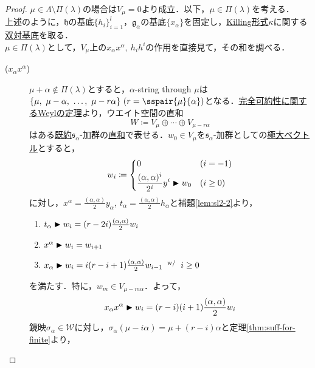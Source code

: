 \documentclass[rep_main]{subfiles}
\begin{document}
\begin{proof}
	$\mu \in \Lambda \setminus \Pi(\lambda)$の場合は$V_\mu = 0$より成立．以下，$\mu \in \Pi(\lambda)$を考える．\\
	上述のように，$\mathfrak{h}$の基底$\{h_i\}_{i=1}^l$，$\mathfrak{g}_\alpha$の基底$\{x_\alpha\}$を固定し，\hyperref[def:Killing-form]{Killing形式}$\kappa$に関する\hyperref[lem:Casimir]{双対基底}を取る．\\
	$\mu \in \Pi(\lambda)$として，$V_\mu$上の$x_\alpha x^\alpha,\ h_ih^i$の作用を直接見て，その和を調べる．
	\begin{description}
		\item[($x_\alpha x^\alpha$)] $\mu + \alpha \notin \Pi(\lambda)$とすると，$\alpha$-string through $\mu$は$\{\mu,\ \mu - \alpha,\ \ldots,\ \mu - r\alpha\}\ (r = \sspair{\mu}{\alpha})$となる．\hyperref[thm:Weyl]{完全可約性に関するWeylの定理}より，ウエイト空間の直和
		\begin{equation}
			W \coloneqq V_\mu \oplus \cdots \oplus V_{\mu - r\alpha}
		\end{equation}
		はある\hyperref[def:irr]{既約}$\mathfrak{s}_\alpha$-加群の\hyperref[def:gmod-directsum]{直和}で表せる．$w_0 \in V_\mu$を$\mathfrak{s}_\alpha$-加群としての\hyperref[def:maximal-vector-rep]{極大ベクトル}とすると，
		\begin{equation}
			w_i \coloneqq \left\{\begin{aligned}
				 &0 &&(i = -1) \\
				 &\frac{(\alpha, \alpha)^i}{2^i}y^i \blacktriangleright w_0  &&(i \geq 0)
			\end{aligned} \right.
		\end{equation}
		に対し，$x^\alpha = \frac{(\alpha, \alpha)}{2}y_\alpha,\ t_\alpha = \frac{(\alpha, \alpha)}{2}h_\alpha$と補題\ref{lem:sl2-2}より，
		\begin{enumerate}
			\item $t_\alpha \blacktriangleright w_i = (r - 2i)\frac{(\alpha, \alpha)}{2}w_i$
			\item $x^\alpha \blacktriangleright w_i = w_{i+1}$
			\item $x_\alpha \blacktriangleright w_i = i(r - i+1)\frac{(\alpha, \alpha)}{2}w_{i-1}  \mathrel{} {}^{\mathrm{w}/} \mathrel{} i \ge 0$
		\end{enumerate}
		を満たす．特に，$w_m \in V_{\mu - m\alpha}$．よって，
		\begin{equation}
			\label{eq:Freudenthal-proof-1}
			x_\alpha x^\alpha \blacktriangleright w_i = (r - i)(i + 1)\frac{(\alpha, \alpha)}{2}w_i
		\end{equation}
		鏡映$\sigma_\alpha \in \mathscr{W}$に対し，$\sigma_\alpha(\mu - i\alpha) = \mu + (r - i)\alpha$と定理\ref{thm:suff-for-finite}より，

\end{description}
\end{proof}
\end{document}
